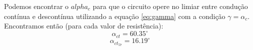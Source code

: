 \documentclass{article}
\begin{document}
Podemos encontrar o $alpha_c$ para que o circuito opere no limiar entre condução contínua e descontínua utilizando a equação \ref{eq:gamma} com a condição $\gamma = \alpha_c$. Encontramos então (para cada valor de resistência):
\begin{equation}
\alpha_{ct} = 60.35^\circ
\end{equation}
\begin{equation}
\alpha_{{ct}_{57}} = 16.19^\circ
\end{equation}



\end{document}
